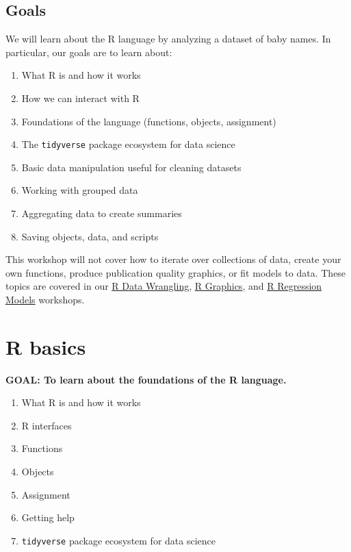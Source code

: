 \documentclass[]{book}
\providecommand{\tightlist}{%
  \setlength{\itemsep}{0pt}\setlength{\parskip}{0pt}}
\begin{document}
\subsection{Goals}\label{goals}

We will learn about the R language by analyzing a dataset of baby names.
In particular, our goals are to learn about:

\begin{enumerate}
\def\labelenumi{\arabic{enumi}.}
\tightlist
\item
  What R is and how it works
\item
  How we can interact with R
\item
  Foundations of the language (functions, objects, assignment)
\item
  The \texttt{tidyverse} package ecosystem for data science
\item
  Basic data manipulation useful for cleaning datasets
\item
  Working with grouped data
\item
  Aggregating data to create summaries
\item
  Saving objects, data, and scripts
\end{enumerate}

This workshop will not cover how to iterate over collections of data,
create your own functions, produce publication quality graphics, or fit
models to data. These topics are covered in our
\href{./RDataWrangling.html}{R Data Wrangling},
\href{./Rgraphics.html}{R Graphics}, and \href{./Rmodels.html}{R
Regression Models} workshops.

\section{R basics}\label{r-basics}

\textbf{GOAL: To learn about the foundations of the R language.}

\begin{enumerate}
\def\labelenumi{\arabic{enumi}.}
\tightlist
\item
  What R is and how it works
\item
  R interfaces
\item
  Functions
\item
  Objects
\item
  Assignment
\item
  Getting help
\item
  \texttt{tidyverse} package ecosystem for data science
\end{enumerate}
\end{document}
